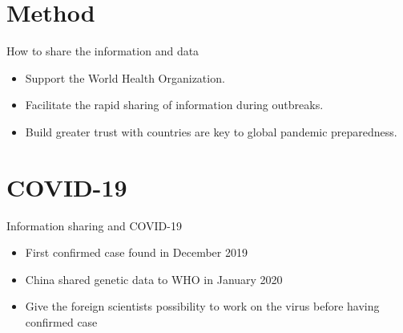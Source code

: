 \documentclass{beamer}
\begin{document}
\section{Method}
\begin{frame}{How to share the information and data}
\begin{itemize}

\item Support the World Health Organization.
\item Facilitate the rapid sharing of information during outbreaks.
\item Build greater trust with countries are key to global pandemic preparedness.
\cite{sciencedaily_2017}
\end{itemize}
\end{frame}


\section{COVID-19}
\begin{frame}{Information sharing and COVID-19}
\begin{itemize}

\item First confirmed case found in December 2019
\item China shared genetic data to WHO in January 2020
\item Give the foreign scientists possibility to work on the virus before having confirmed case
\cite{lisa schnirring}

\end{itemize}
\end{frame}
\end{document}
